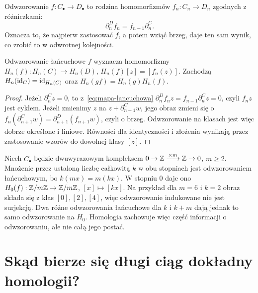 \begin{definicja}
\label{def:mapa-lancuchowa}
Odwzorowanie $f:C_\bullet\to D_\bullet$ to rodzina
homomorfizmów $f_n:C_n\to D_n$ zgodnych
z różniczkami:
\begin{equation}\label{eq:mapa-lancuchowa}
 \partial^D_n f_n=f_{n-1}\partial^C_n.
\end{equation}
Oznacza to, że najpierw zastosować $f$,
a potem wziąć brzeg, daje ten sam wynik,
co zrobić to w odwrotnej kolejności.
\end{definicja}

\begin{stwierdzenie}
\label{prop:homologia-funktor}
Odwzorowanie łańcuchowe $f$ wyznacza homomorfizmy
$H_n(f):H_n(C)\to H_n(D)$,
$H_n(f)[z]=[f_n(z)]$. Zachodzą
$H_n(\mathrm{id}_C)=\mathrm{id}_{H_n(C)}$ oraz
$H_n(gf)=H_n(g)H_n(f)$.
\end{stwierdzenie}
\begin{proof}
Jeżeli $\partial^C_n z=0$, to z~\eqref{eq:mapa-lancuchowa}
$\partial^D_n f_nz=f_{n-1}\partial^C_nz=0$, czyli
$f_nz$ jest cyklem. Jeżeli zmienimy
$z$ na $z+\partial^C_{n+1}w$, jego obraz zmieni się o
$f_n(\partial^C_{n+1}w)=\partial^D_{n+1}(f_{n+1}w)$,
czyli o brzeg. Odwzorowanie na klasach jest więc
dobrze określone i liniowe.
Równości dla identyczności i złożenia
wynikają przez zastosowanie wzorów
do dowolnej klasy $[z]$.
\end{proof}

\begin{przyklad}
\label{prz:homologia-mapa-mod-m}
Niech $C_\bullet$ będzie dwuwyrazowym kompleksem
$0\to\mathbb{Z}\xrightarrow{\times m}\mathbb{Z}\to0$,
$m\geq2$. Mnożenie przez ustaloną liczbę
całkowitą $k$ w obu stopniach jest odwzorowaniem
łańcuchowym, bo $k(mx)=m(kx)$.
W stopniu $0$ daje ono
$H_0(f):\mathbb{Z}/m\mathbb{Z}\to\mathbb{Z}/m\mathbb{Z}$, $[x]\mapsto[kx]$.
Na przykład dla $m=6$ i $k=2$ obraz składa się
z klas $[0],[2],[4]$, więc odwzorowanie
indukowane nie jest surjekcją. Dwa różne
odwzorowania łańcuchowe dla $k$ i $k+m$
dają jednak to samo odwzorowanie na $H_0$.
Homologia zachowuje więc część informacji
o odwzorowaniu, ale nie całą jego postać.
\end{przyklad}

\section{Skąd bierze się długi ciąg dokładny homologii?}
\label{sec:dlugi-ciag-homologii}

